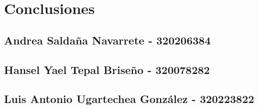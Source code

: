 \documentclass[12pt, letterpaper]{article}
\begin{document}
\section*{Conclusiones}

\subsection*{Andrea Saldaña Navarrete - 320206384}


\subsection*{Hansel Yael Tepal Briseño - 320078282}


\subsection*{Luis Antonio Ugartechea González - 320223822}



\end{document}
